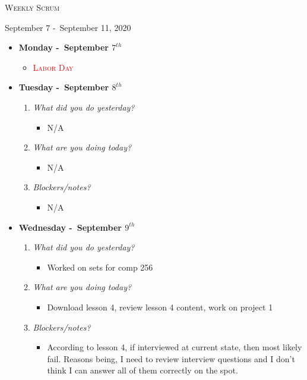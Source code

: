 \centerline{\LARGE\textsc{Weekly Scrum}}
\centerline{September 7 -\ September 11, 2020}
\textbf{}
\begin{itemize}
  \item[] \textbf{\large Monday -\ September \(7^{th}\)}
  \begin{itemize}
    \item \textcolor{red}{\textsc{Labor Day}}
  \end{itemize}
\end{itemize}
\textbf{}
\begin{itemize}
  \item[] \textbf{\large Tuesday -\ September \(8^{th}\)}
  \begin{enumerate}
    \item \textsl{What did you do yesterday?}
    \begin{itemize}
      \item N/A
    \end{itemize}
    \item \textsl{What are you doing today?}
    \begin{itemize}
      \item N/A
    \end{itemize}
    \item \textsl{Blockers/notes?}
    \begin{itemize}
      \item N/A
    \end{itemize}
  \end{enumerate}
\end{itemize}
\textbf{}
\begin{itemize}
  \item[] \textbf{\large Wednesday -\ September \(9^{th}\)}
  \begin{enumerate}
    \item \textsl{What did you do yesterday?}
    \begin{itemize}
      \item Worked on sets for comp 256
    \end{itemize}
    \item \textsl{What are you doing today?}
    \begin{itemize}
      \item Download lesson 4, review lesson 4 content, work on project 1
    \end{itemize}
    \item \textsl{Blockers/notes?}
    \begin{itemize}
      \item According to lesson 4, if interviewed at current state, then most likely fail. Reasons being, I need to review interview questions and I don't think I can answer all of them correctly on the spot.
    \end{itemize}
  \end{enumerate}
\end{itemize}
